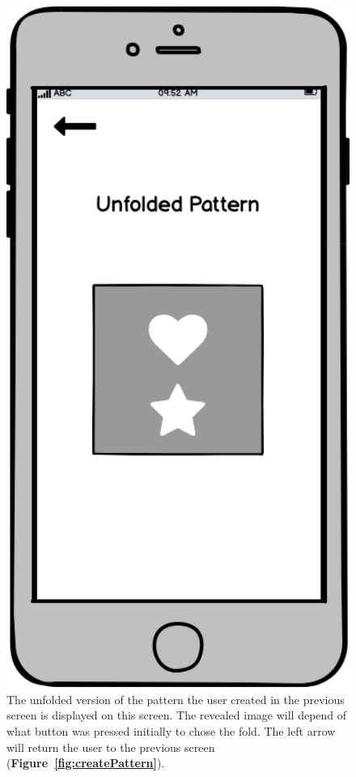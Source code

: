 \documentclass[11pt]{article}
\begin{document}
            \begin{figure}
                \begin{minipage}[c]{0.65\textwidth}
                \caption{The unfolded version of the pattern the user created in the previous screen is displayed on this screen. The revealed image will depend of what button was pressed initially to chose the fold. The left arrow will return the user to the previous screen (\textbf{Figure~\ref{fig:createPattern}}).}
                \label{fig:reveal}
                \end{minipage}\hfill
                \begin{minipage}[c]{0.35\textwidth}
                \includegraphics[width=1\textwidth]{Images/Prototype/prototypeReveal.png}
                \end{minipage}
            \end{figure}
            
\end{document}
